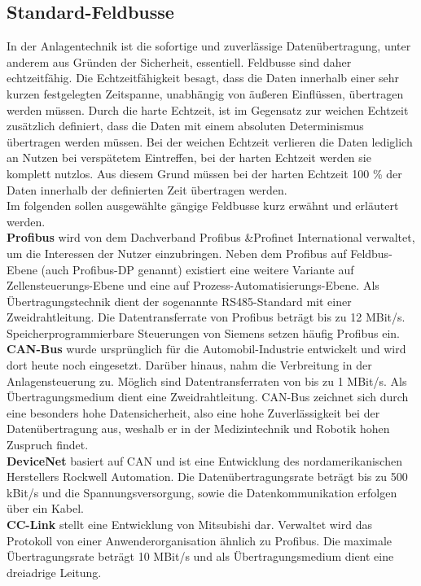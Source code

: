 \documentclass[ a4paper,
                oneside,
                toc=bibliography,
                toc=listof
                ]{scrbook}
\begin{document}
	\subsection{Standard-Feldbusse}
	\label{subsec:StandardFeldbus}
	In der Anlagentechnik ist die sofortige und zuverlässige Datenübertragung, unter anderem aus Gründen der Sicherheit, essentiell. Feldbusse sind daher echtzeitfähig. Die Echtzeitfähigkeit besagt, dass die Daten innerhalb einer sehr kurzen festgelegten Zeitspanne, unabhängig von äußeren Einflüssen, übertragen werden müssen. Durch die harte Echtzeit, ist im Gegensatz zur weichen Echtzeit zusätzlich definiert, dass die Daten mit einem absoluten Determinismus übertragen werden müssen. Bei der weichen Echtzeit verlieren die Daten lediglich an Nutzen bei verspätetem Eintreffen, bei der harten Echtzeit werden sie komplett nutzlos. Aus diesem Grund müssen bei der harten Echtzeit 100 \% der Daten innerhalb der definierten Zeit übertragen werden. \cite{dopatka2008framework} \cite{Echtzeit} \\
	Im folgenden sollen ausgewählte gängige Feldbusse kurz erwähnt und erläutert werden.\\
	\textbf{Profibus} wird von dem Dachverband \glqq Profibus \&Profinet International\grqq{} verwaltet, um die Interessen der Nutzer einzubringen. Neben dem Profibus auf Feldbus-Ebene (auch Profibus-DP genannt) existiert eine weitere Variante auf Zellensteuerungs-Ebene und eine auf Prozess-Automatisierungs-Ebene. Als Übertragungstechnik dient der sogenannte RS485-Standard mit einer Zweidrahtleitung. Die Datentransferrate von Profibus beträgt bis zu 12 MBit/s. Speicherprogrammierbare Steuerungen von Siemens setzen häufig Profibus ein.  \cite{hering2012elektrotechnik}\\
	\textbf{CAN-Bus} wurde ursprünglich für die Automobil-Industrie entwickelt und wird dort heute noch eingesetzt. Darüber hinaus, nahm die Verbreitung in der Anlagensteuerung zu. Möglich sind Datentransferraten von bis zu 1 MBit/s. Als Übertragungsmedium dient eine Zweidrahtleitung. CAN-Bus zeichnet sich durch eine besonders hohe Datensicherheit, also eine hohe Zuverlässigkeit bei der Datenübertragung aus, weshalb er in der Medizintechnik und Robotik hohen Zuspruch findet. \cite{hering2012elektrotechnik}\\
	\textbf{DeviceNet} basiert auf CAN und ist eine Entwicklung des nordamerikanischen Herstellers \glqq Rockwell Automation\grqq. Die Datenübertragungsrate beträgt bis zu 500 kBit/s und die Spannungsversorgung, sowie die Datenkommunikation erfolgen über ein Kabel. \cite{hering2012elektrotechnik}\\
	\textbf{CC-Link} stellt eine Entwicklung von \glqq Mitsubishi\grqq{} dar. Verwaltet wird das Protokoll von einer Anwenderorganisation ähnlich zu Profibus. Die maximale Übertragungsrate beträgt 10 MBit/s und als Übertragungsmedium dient eine dreiadrige Leitung. \cite{hering2012elektrotechnik}\\
\end{document}
